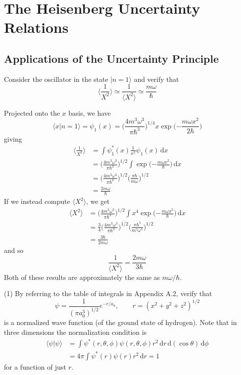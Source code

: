 \documentclass[../principles-of-quantum-mechanics.tex]{subfiles}
\begin{document}
	\printanswers
	
	\setcounter{section}{8}
	\section{The Heisenberg Uncertainty Relations}
	
	\setcounter{subsection}{3}
	\subsection{Applications of the Uncertainty Principle}
	
	\begin{questions}
		\question Consider the oscillator in the state $|n = 1\rangle$ and verify that
		$$\Big\langle\frac{1}{X^2}\Big\rangle \simeq \frac{1}{\langle X^2\rangle} \simeq \frac{m\omega}{\hbar}$$
		\begin{solution}
			Projected onto the $x$ basis, we have
			$$\langle x|n = 1\rangle = \psi_1(x) = \Big(\frac{4m^3\omega^3}{\pi\hbar^3}\Big)^{1/4} x\exp\Big({-\frac{m\omega x^2}{2\hbar}}\Big)$$
			giving
			\begin{align*}
				\Big\langle \frac{1}{X^2}\Big\rangle &= \int \psi_1^*(x)\frac{1}{x^2}\psi_1(x)\,\mathrm{d}x \\
				&= \Big(\frac{4m^3\omega^3}{\pi\hbar^3}\Big)^{1/2}\int \exp\Big({-\frac{m\omega x^2}{\hbar}}\Big)\,\mathrm{d}x \\
				&= \Big(\frac{4m^3\omega^3}{\pi\hbar^3}\Big)^{1/2}\Big(\frac{\pi\hbar}{m\omega}\Big)^{1/2} \\
				&= \frac{2m\omega}{\hbar}
			\end{align*}
			If we instead compute $\langle X^2\rangle$, we get
			\begin{align*}
				\langle X^2\rangle &= \Big(\frac{4m^3\omega^3}{\pi\hbar^3}\Big)^{1/2}\int x^4\exp\Big({-\frac{m\omega x^2}{\hbar}}\Big)\,\mathrm{d}x \\
				&= \frac{3}{4}\Big(\frac{4m^3\omega^3}{\pi\hbar^3}\Big)^{1/2}\Big(\frac{\pi\hbar^5}{m^5\omega^5}\Big)^{1/2} \\
				&= \frac{3\hbar}{2m\omega}
			\end{align*}
			and so
			$$\frac{1}{\langle X^2\rangle} = \frac{2m\omega}{3\hbar}$$
			Both of these results are approximately the same as $m\omega/\hbar$.
		\end{solution}
		
		\question (1) By referring to the table of integrals in Appendix A.2, verify that
		$$\psi = \frac{1}{(\pi a_0^3)^{1/2}}e^{-r/a_0}, \qquad r = (x^2 + y^2 + z^2)^{1/2}$$
		is a normalized wave function (of the ground state of hydrogen). Note that in three dimensions the normalization condition is
		\begin{align*}
			\langle \psi|\psi\rangle &= \int\psi^*(r, \theta, \phi)\psi(r, \theta, \phi)r^2\,\mathrm{d}r\,\mathrm{d}(\cos\theta)\,\mathrm{d}\phi \\
			&= 4\pi\int \psi^*(r)\psi(r) r^2\,\mathrm{d}r = 1
		\end{align*}
		for a function of just $r$.
		

\end{questions}
\end{document}
